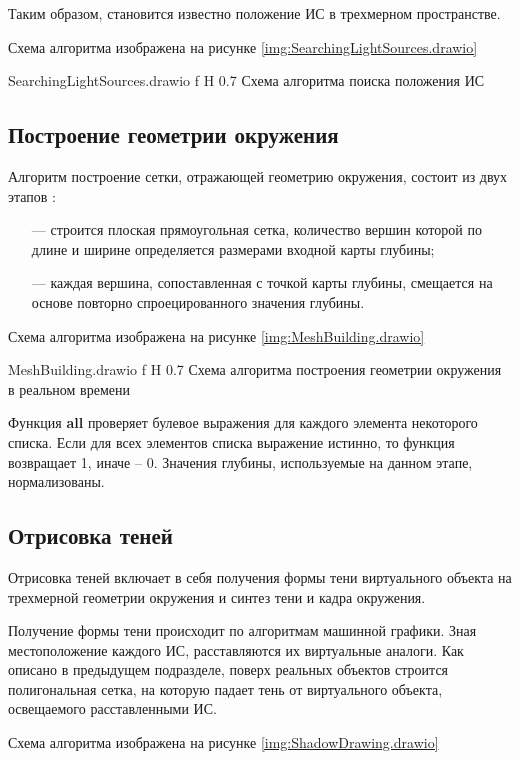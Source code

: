 Таким образом, становится известно положение ИС в трехмерном пространстве.

Схема алгоритма изображена на рисунке \ref{img:SearchingLightSources.drawio}

{SearchingLightSources.drawio}
{f}
{H}
{0.7\textwidth}
{Схема алгоритма поиска положения ИС}

\subsection{Построение геометрии окружения}

Алгоритм построение сетки, отражающей геометрию окружения, состоит из двух этапов \cite{du2020depthlab}: 

\begin{itemize}
	\item[---] строится плоская прямоугольная сетка, количество вершин которой по длине и ширине определяется размерами входной карты глубины;
	\item[---] каждая вершина, сопоставленная с точкой карты глубины, смещается на основе повторно спроецированного значения глубины.
\end{itemize}

Схема алгоритма изображена на рисунке \ref{img:MeshBuilding.drawio}

{MeshBuilding.drawio}
{f}
{H}
{0.7\textwidth}
{Схема алгоритма построения геометрии окружения в реальном времени}

Функция \textbf{all} проверяет булевое выражения для каждого элемента некоторого списка. Если для всех элементов списка выражение истинно, то функция возвращает 1, иначе -- 0. Значения глубины, используемые на данном этапе, нормализованы.

\subsection{Отрисовка теней}

Отрисовка теней включает в себя получения формы тени виртуального объекта на трехмерной геометрии окружения и синтез тени и кадра окружения.

Получение формы тени происходит по алгоритмам машинной графики. Зная местоположение каждого ИС, расставляются их виртуальные аналоги. Как описано в предыдущем подразделе, поверх реальных объектов строится полигональная сетка, на которую падает тень от виртуального объекта, освещаемого расставленными ИС.

Схема алгоритма изображена на рисунке \ref{img:ShadowDrawing.drawio}

